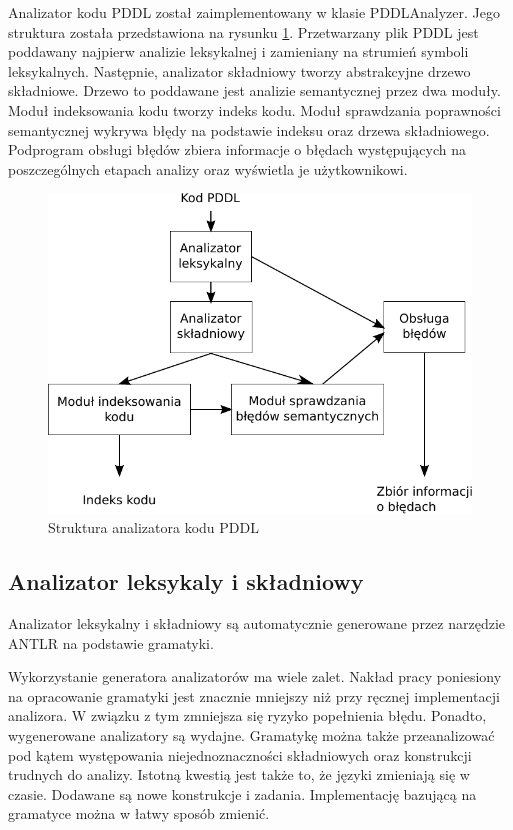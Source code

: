 Analizator kodu PDDL został zaimplementowany w klasie PDDLAnalyzer.
Jego struktura została przedstawiona na rysunku \ref{ana_structure}.
Przetwarzany plik PDDL jest poddawany najpierw analizie leksykalnej i zamieniany
na strumień symboli leksykalnych. Następnie, analizator składniowy tworzy abstrakcyjne
drzewo składniowe. Drzewo to poddawane jest analizie semantycznej przez dwa moduły.
Moduł indeksowania kodu tworzy indeks kodu.
Moduł sprawdzania poprawności semantycznej wykrywa błędy na podstawie indeksu oraz
drzewa składniowego. Podprogram obsługi błędów zbiera informacje o błędach występujących
na poszczególnych etapach analizy oraz wyświetla je użytkownikowi.

\begin{figure}[h]
  \centering
    \includegraphics{img/ana_structure.pdf}
    \caption{Struktura analizatora kodu PDDL}
    \label{ana_structure}
\end{figure}


\subsection{Analizator leksykaly i składniowy}
Analizator leksykalny i składniowy są automatycznie generowane przez narzędzie ANTLR
na podstawie gramatyki. 

Wykorzystanie generatora analizatorów ma wiele zalet. Nakład pracy poniesiony na
opracowanie gramatyki jest znacznie mniejszy niż przy ręcznej implementacji analizora.
W związku z tym zmniejsza się ryzyko popełnienia błędu. Ponadto, wygenerowane analizatory są 
wydajne. Gramatykę można także przeanalizować pod kątem występowania niejednoznaczności
składniowych
oraz konstrukcji trudnych do analizy. Istotną kwestią jest także to, że
języki zmieniają się w czasie. Dodawane są nowe konstrukcje i zadania. Implementację
bazującą na gramatyce można w łatwy sposób zmienić.

